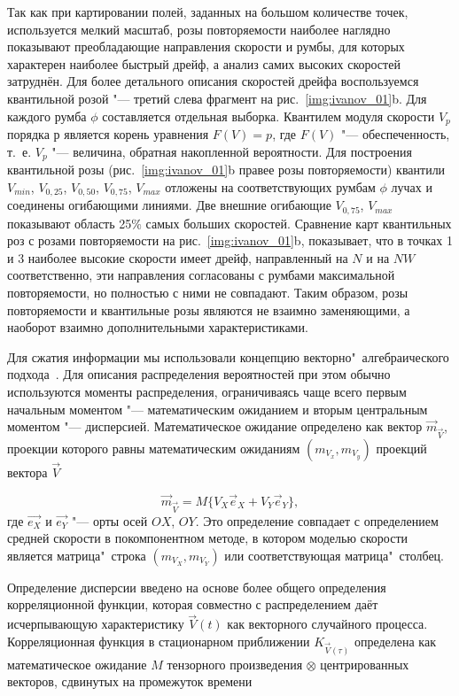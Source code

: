 Так как при картировании полей, заданных на большом количестве точек, используется мелкий масштаб, розы повторяемости наиболее наглядно показывают   преобладающие направления скорости и румбы, для которых характерен наиболее быстрый дрейф, а анализ самих высоких скоростей затруднён. Для более детального описания скоростей дрейфа воспользуемся квантильной розой "--- третий слева фрагмент на рис.~\ref{img:ivanov_01}b. Для каждого румба $\phi$ составляется отдельная выборка. Квантилем модуля скорости $V_p$ порядка $р$ является корень уравнения $F(V)=p$, где $F(V)$ "--- обеспеченность, т.~е. $V_p$ "--- величина, обратная накопленной вероятности. Для построения квантильной розы (рис.~\ref{img:ivanov_01}b правее розы повторяемости) квантили $V_{min}$, $V_{0,25}$, $V_{0,50}$, $V_{0,75}$, $V_{max}$  отложены на соответствующих румбам $\phi$ лучах и соединены огибающими линиями. Две внешние огибающие $V_{0,75}$, $V_{max}$ показывают область 25$\%$ самых больших скоростей. Сравнение карт квантильных роз с розами повторяемости на рис.~\ref{img:ivanov_01}b, показывает, что в точках 1 и 3 наиболее высокие скорости имеет дрейф,  направленный на $N$ и на $NW$ соответственно, эти направления согласованы с румбами максимальной повторяемости, но полностью с ними не совпадают. Таким образом, розы повторяемости и квантильные розы являются не взаимно заменяющими, а наоборот взаимно дополнительными характеристиками.

Для сжатия информации мы использовали концепцию векторно"~алгебраического подхода~\cite{Belyshev1983}. Для описания распределения вероятностей при этом обычно используются моменты распределения, ограничиваясь чаще всего первым начальным моментом "--- математическим ожиданием и вторым центральным моментом "--- дисперсией. Математическое ожидание определено как вектор $\vec{m}_{\vec{V}}$, проекции которого равны математическим ожиданиям $(m_{V_x},m_{V_y})$ проекций вектора $\vec{V}$

\begin{equation}
\label{eq:equation3_2}
\vec{m}_{\vec{V}}=M\{V_X\vec{e}_X+V_Y\vec{e}_Y\},
\end{equation}
где $\vec{e_X}$ и $\vec{e_Y}$ "--- орты осей $OX$, $OY$. Это определение совпадает с определением средней скорости в покомпонентном методе, в котором моделью скорости является матрица"~строка $(m_{V_X},m_{V_Y})$ или соответствующая матрица"~столбец.

Определение дисперсии введено на основе более общего определения корреляционной функции, которая совместно с распределением  даёт исчерпывающую характеристику $\vec{V}(t)$ как векторного случайного процесса. Корреляционная функция в стационарном приближении $K_{\vec{V}(\tau)}$ определена как математическое ожидание $M$ тензорного произведения $\otimes$ центрированных векторов, сдвинутых на промежуток времени  

